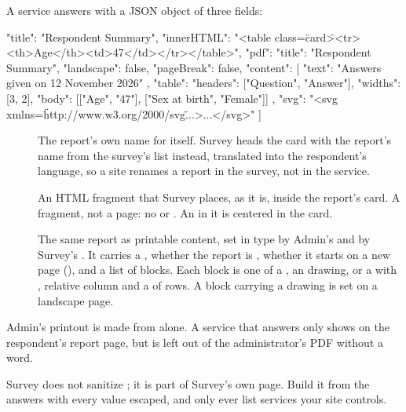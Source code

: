 \documentclass[11pt, a4paper]{article}
\begin{document}
A service answers  with a JSON object of three fields:

\begin{elicitfile}[fontsize = \footnotesize]
{
  "title": "Respondent Summary",
  "innerHTML": "<table class=\"card\"><tr><th>Age</th><td>47</td></tr></table>",
  "pdf": {
    "title": "Respondent Summary",
    "landscape": false,
    "pageBreak": false,
    "content": [
      { "text": "Answers given on 12 November 2026" },
      { "table": { "headers": ["Question", "Answer"], "widths": [3, 2],
                   "body": [["Age", "47"], ["Sex at birth", "Female"]] } },
      { "svg": "<svg xmlns=\"http://www.w3.org/2000/svg\" ...>...</svg>" }
    ]
  }
}
\end{elicitfile}

\begin{description}
  \item[] The report's own name for itself. Survey heads the card with the
        report's name from the survey's list instead, translated into the respondent's
        language, so a site renames a report in the survey, not in the service.
  \item[] An HTML fragment that Survey places, as it is, inside the report's
        card. A fragment, not a page: no  or . An  in it
        is centered in the card.
  \item[] The same report as printable content, set in type by Admin's
         and by Survey's . It carries a , whether
        the report is , whether it starts on a new page (), and
        a list of  blocks. Each block is one of a , an 
        drawing, or a  with , relative column  and a
         of rows. A block carrying a drawing is set on a landscape page.
\end{description}

\begin{elicitcaution}
Admin's printout is made from  alone. A service that answers only 
shows on the respondent's report page, but is left out of the administrator's PDF without a
word.
\end{elicitcaution}

\begin{elicitcaution}
Survey does not sanitize ; it is part of Survey's own page. Build it from the
answers with every value escaped, and only ever list services your site controls.
\end{elicitcaution}
\end{document}

